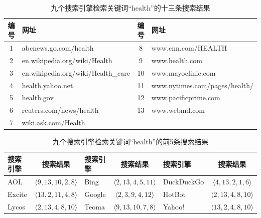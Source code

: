 \begin{table}[htbp]
\centering
\begin{tabular}{|c|l|c|l|}
\hline
编号 & 网址 & 编号 & 网址\\
\hline
1 & abcnews.go.com/health & 8 & www.cnn.com/HEALTH\\
2 & en.wikipedia.org/wiki/Health & 9 & www.health.com\\
3 & en.wikipedia.org/wiki/Health\_care & 10 & www.mayoclinic.com\\
4 & health.yahoo.net & 11 & www.nytimes.com/pages/health/\\
5 & health.gov & 12 & www.pacificprime.com\\
6 & reuters.com/news/health & 13 & www.webmd.com\\
7 & wiki.ask.com/Health &&\\
\hline
\end{tabular}
\caption{九个搜索引擎检索关键词“health”的十三条搜索结果}
\label{tbl:metaserp}
\end{table}

\begin{table}[htbp]
\centering
\begin{tabular}{|l|c|l|c|l|c|}
\hline
搜索引擎 & 搜索结果 & 搜索引擎 & 搜索结果 & 搜索引擎 & 搜索结果\\
\hline
AOL & $\langle 9,13,10,2,8\rangle$ & Bing & $\langle 2,13,4,5,11\rangle$ & DuckDuckGo & $\langle 4,13,2,1,6\rangle$ \\
Excite & $\langle 13,2,11,4,8\rangle$ & Google & $\langle 2,3,9,4,12\rangle$ & HotBot & $\langle 2,13,4,8,10\rangle$ \\
Lycos & $\langle 2,13,4,8,10\rangle$ & Teoma & $\langle 9,13,10,7,8\rangle$ & Yahoo! & $\langle 13,2,4,8,10\rangle$\\
\hline
\end{tabular}
\caption{九个搜索引擎检索关键词“health”的前5条搜索结果}
\label{tbl:serplist}
\end{table}


